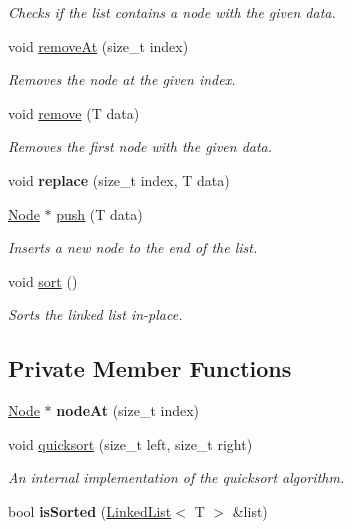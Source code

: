 \begin{DoxyCompactItemize}
\begin{DoxyCompactList}\small\item\em Checks if the list contains a node with the given data. \end{DoxyCompactList}\item 
void \hyperlink{classLinkedList_ae19893f875003b17caf0f71d26167fd4}{remove\+At} (size\+\_\+t index)
\begin{DoxyCompactList}\small\item\em Removes the node at the given index. \end{DoxyCompactList}\item 
void \hyperlink{classLinkedList_ab9aa6e03f271785f6b488d8c4cc3f3c7}{remove} (T data)
\begin{DoxyCompactList}\small\item\em Removes the first node with the given data. \end{DoxyCompactList}\item 
\mbox{\label{classLinkedList_a0a7ce2592ff7566349f68a1cb60bf00b}} 
void {\bfseries replace} (size\+\_\+t index, T data)
\item 
\hyperlink{structLinkedList_1_1Node}{Node} $\ast$ \hyperlink{classLinkedList_a3a1e6c2009b611fb4416574178b316a3}{push} (T data)
\begin{DoxyCompactList}\small\item\em Inserts a new node to the end of the list. \end{DoxyCompactList}\item 
\mbox{\label{classLinkedList_a691b27f81c60be3c891fe6d56a4718b4}} 
void \hyperlink{classLinkedList_a691b27f81c60be3c891fe6d56a4718b4}{sort} ()
\begin{DoxyCompactList}\small\item\em Sorts the linked list in-\/place. \end{DoxyCompactList}\end{DoxyCompactItemize}
\subsection*{Private Member Functions}
\begin{DoxyCompactItemize}
\item 
\mbox{\label{classLinkedList_ae19ff3c4e501a9638fa5caf5cc9d5b05}} 
\hyperlink{structLinkedList_1_1Node}{Node} $\ast$ {\bfseries node\+At} (size\+\_\+t index)
\item 
void \hyperlink{classLinkedList_a38612b71d816fec54ea379d0b8daec76}{quicksort} (size\+\_\+t left, size\+\_\+t right)
\begin{DoxyCompactList}\small\item\em An internal implementation of the quicksort algorithm. \end{DoxyCompactList}\item 
\mbox{\label{classLinkedList_ad67db427015a08993372ed5479dde828}} 
bool {\bfseries is\+Sorted} (\hyperlink{classLinkedList}{Linked\+List}$<$ T $>$ \&list)
\end{DoxyCompactItemize}
